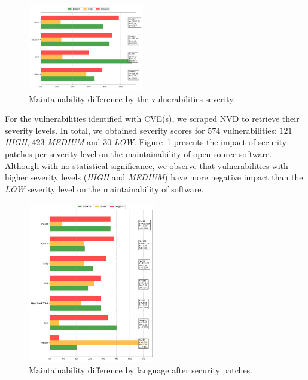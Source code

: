 \documentclass[sigconf,review]{acmart}
\begin{document}
\begin{figure}[h]
 	\centering 	\includegraphics[width=0.45\textwidth]{figures/maintainability_severity.pdf}
 	\caption{Maintainability difference by the vulnerabilities severity.}
	\label{fig:severity}
	
\end{figure}

For the vulnerabilities identified with CVE(s), we scraped NVD to retrieve 
their severity levels. In total, we obtained severity scores for $574$ 
vulnerabilities: $121$ \emph{HIGH}, $423$ \emph{MEDIUM} and $30$ \emph{LOW}. 
Figure~\ref{fig:severity} presents the impact
of security patches per severity level on the maintainability of open-source 
software. Although with no statistical significance, we observe that 
vulnerabilities with higher severity levels (\emph{HIGH} and \emph{MEDIUM}) have more negative impact than the \emph{LOW} severity level on the
maintainability of software.


\begin{figure}[h]
  \centering
  \includegraphics[width=0.5\textwidth]{figures/maintainability_language.pdf}
  \caption{Maintainability difference by language after security patches.}
  \label{fig:lang_main}  
\end{figure}
\end{document}

